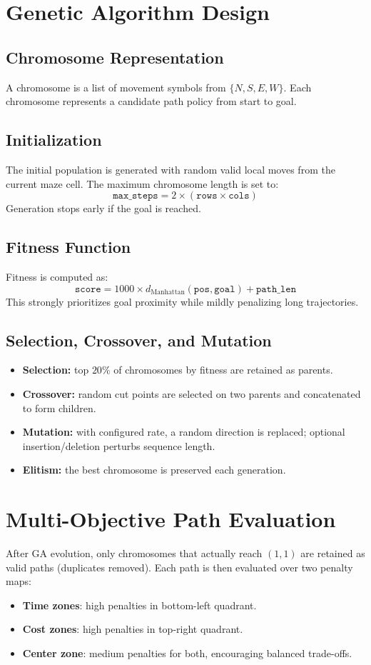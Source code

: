 \documentclass[12pt]{article}
\begin{document}
\section{Genetic Algorithm Design}
\subsection{Chromosome Representation}
A chromosome is a list of movement symbols from \(\{N, S, E, W\}\). Each chromosome represents a candidate path policy from start to goal.

\subsection{Initialization}
The initial population is generated with random valid local moves from the current maze cell. The maximum chromosome length is set to:
\[
\texttt{max\_steps} = 2 \times (\texttt{rows} \times \texttt{cols})
\]
Generation stops early if the goal is reached.

\subsection{Fitness Function}
Fitness is computed as:
\[
\texttt{score} = 1000 \times d_{\text{Manhattan}}(\texttt{pos}, \texttt{goal}) + \texttt{path\_len}
\]
This strongly prioritizes goal proximity while mildly penalizing long trajectories.

\subsection{Selection, Crossover, and Mutation}
\begin{itemize}
    \item \textbf{Selection:} top \(20\%\) of chromosomes by fitness are retained as parents.
    \item \textbf{Crossover:} random cut points are selected on two parents and concatenated to form children.
    \item \textbf{Mutation:} with configured rate, a random direction is replaced; optional insertion/deletion perturbs sequence length.
    \item \textbf{Elitism:} the best chromosome is preserved each generation.
\end{itemize}

\section{Multi-Objective Path Evaluation}
After GA evolution, only chromosomes that actually reach \((1,1)\) are retained as valid paths (duplicates removed). Each path is then evaluated over two penalty maps:
\begin{itemize}
    \item \textbf{Time zones}: high penalties in bottom-left quadrant.
    \item \textbf{Cost zones}: high penalties in top-right quadrant.
    \item \textbf{Center zone}: medium penalties for both, encouraging balanced trade-offs.
\end{itemize}
\end{document}
